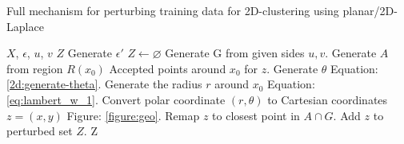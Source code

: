 \begin{algorithm}[H]
  \caption{Full mechanism for perturbing training data for 2D-clustering using planar/2D-Laplace \citep{DBLP:journals/corr/abs-1212-1984}}\label{alg:rq1}
  \begin{algorithmic}
    \Require $X$, $\epsilon$, $u$, $v$ 
    \Ensure $Z$ 
    \State Generate $\epsilon'$         
    \State $Z \gets \varnothing$
    \State Generate G from given sides $u, v$.
    \State Generate $A$ from region $R(x_0)$ \Comment Accepted points around $x_0$ for $z$.
    \State Generate $\theta$       \Comment Equation: \ref{2d:generate-theta}.
    \State Generate the radius $r$ around $x_0$ \Comment Equation: \ref{eq:lambert_w_1}.
    \State Convert polar coordinate $(r,\theta)$ to Cartesian coordinates $z = (x, y)$ \Comment Figure: \ref{figure:geo}.
        \State Remap $z$ to closest point in $A \cap G$. 
    \EndIf
    \State Add $z$ to perturbed set $Z$.
    \EndFor
    \State \Return Z
  \end{algorithmic}
  \label{alg:2d-laplace}
\end{algorithm}